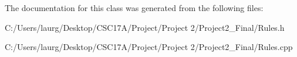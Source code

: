 The documentation for this class was generated from the following files\+:\begin{DoxyCompactItemize}
\item 
C\+:/\+Users/laurg/\+Desktop/\+C\+S\+C17\+A/\+Project/\+Project 2/\+Project2\+\_\+\+Final/Rules.\+h\item 
C\+:/\+Users/laurg/\+Desktop/\+C\+S\+C17\+A/\+Project/\+Project 2/\+Project2\+\_\+\+Final/Rules.\+cpp\end{DoxyCompactItemize}
